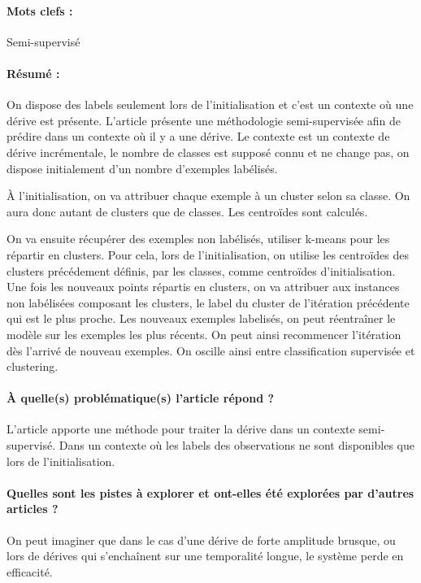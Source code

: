 \documentclass[11pt,a4paper]{report}
\begin{document}
\paragraph{Mots clefs :} Semi-supervisé

\paragraph{Résumé :} On dispose des labels seulement lors de l'initialisation et c'est un contexte où une dérive est présente.
L'article présente une méthodologie semi-supervisée afin de prédire dans un contexte où il y a une dérive. Le contexte est un contexte de dérive incrémentale, le nombre de classes est supposé connu et ne change pas, on dispose initialement d'un nombre d'exemples labélisés.

 À l'initialisation, on va attribuer chaque exemple à un cluster selon sa classe. On aura donc autant de clusters que de classes. Les centroïdes sont calculés.
 
 On va ensuite récupérer des exemples non labélisés, utiliser k-means pour les répartir en clusters. Pour cela, lors de l'initialisation, on utilise les centroïdes des clusters précédement définis, par les classes, comme centroïdes d'initialisation. Une fois les nouveaux points répartis en clusters, on va attribuer aux instances non labélisées composant les clusters, le label du cluster de l'itération précédente qui est le plus proche. Les nouveaux exemples labelisés, on peut réentraîner le modèle sur les exemples les plus récents. 
On peut ainsi recommencer l'itération dès l'arrivé de nouveau exemples. On oscille ainsi entre classification supervisée et clustering.

\paragraph{À quelle(s) problématique(s) l'article répond ?} L'article apporte une méthode pour traiter la dérive dans un contexte semi-supervisé. Dans un contexte où les labels des observations ne sont disponibles que lors de l'initialisation.

\paragraph{Quelles sont les pistes à explorer et ont-elles  été explorées par d'autres articles ?} On peut imaginer que dans le cas d'une dérive de forte amplitude brusque, ou lors de dérives qui s'enchaînent sur une temporalité longue, le système perde en efficacité.
\end{document}
